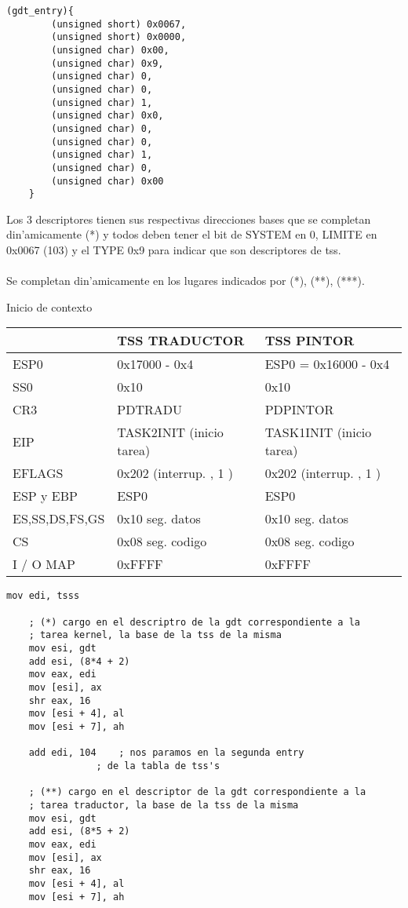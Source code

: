 \documentclass[11pt]{article}
\begin{document}
\begin{enumerate}
\begin{enumerate}
\begin{lstlisting}[frame=single]
	(gdt_entry){ 
		(unsigned short) 0x0067, 
		(unsigned short) 0x0000,
		(unsigned char) 0x00, 
		(unsigned char) 0x9,
		(unsigned char) 0, 
		(unsigned char) 0, 
		(unsigned char) 1, 
		(unsigned char) 0x0,
		(unsigned char) 0,  
		(unsigned char) 0,  
		(unsigned char) 1,  
		(unsigned char) 0, 
		(unsigned char) 0x00 
	}
\end{lstlisting}
\end{enumerate}
Los 3 descriptores tienen sus respectivas direcciones bases que se completan din'amicamente (*) y todos deben tener el bit de SYSTEM en 0, LIMITE en 0x0067 (103) y el TYPE 0x9 para indicar que son descriptores de tss. \\
\\
Se completan din'amicamente en los lugares indicados por (*), (**), (***). \\
\begin{center} Inicio de contexto \\
\begin{tabular}[t]{|l|l|l|}
\hline
\textbf{} & \textbf{TSS TRADUCTOR} & \textbf{TSS PINTOR} \\
\hline
ESP0 & 0x17000 - 0x4 & ESP0 = 0x16000 - 0x4 \\
SS0 & 0x10 & 0x10 \\
CR3 & PDTRADU & PDPINTOR \\
EIP & TASK2INIT (inicio tarea) & TASK1INIT (inicio tarea) \\
EFLAGS & 0x202 (interrup. , 1 ) & 0x202 (interrup. , 1 ) \\
ESP y EBP & ESP0 & ESP0 \\
ES,SS,DS,FS,GS & 0x10 seg. datos & 0x10 seg. datos \\
CS & 0x08 seg. codigo & 0x08 seg. codigo \\
I / O MAP & 0xFFFF & 0xFFFF \\
\hline
\end{tabular}
\end{center}
\begin{lstlisting}[frame=single]
	mov	edi, tsss

	; (*) cargo en el descriptro de la gdt correspondiente a la 
	; tarea kernel, la base de la tss de la misma
	mov	esi, gdt
	add	esi, (8*4 + 2)
	mov	eax, edi
	mov	[esi], ax
	shr	eax, 16
	mov	[esi + 4], al
	mov	[esi + 7], ah
	
	add	edi, 104	; nos paramos en la segunda entry
				; de la tabla de tss's

	; (**) cargo en el descriptor de la gdt correspondiente a la
	; tarea traductor, la base de la tss de la misma
	mov	esi, gdt
	add	esi, (8*5 + 2)
	mov	eax, edi
	mov	[esi], ax
	shr	eax, 16
	mov	[esi + 4], al
	mov	[esi + 7], ah


\end{lstlisting}
\end{enumerate}
\end{document}
